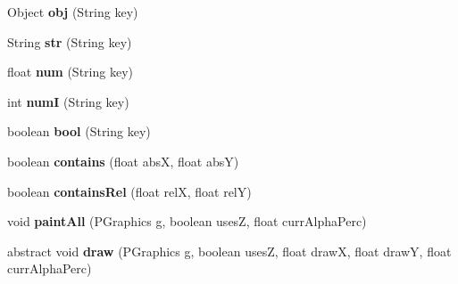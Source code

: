 \begin{DoxyCompactItemize}
\item 
\hypertarget{classhype_1_1drawable_1_1_h_drawable_ae9ef9be1550351bb13884016ccc755f1}{Object {\bfseries obj} (String key)}\label{classhype_1_1drawable_1_1_h_drawable_ae9ef9be1550351bb13884016ccc755f1}

\item 
\hypertarget{classhype_1_1drawable_1_1_h_drawable_a0d2393ad2936ee21fbb73fe8044f8c03}{String {\bfseries str} (String key)}\label{classhype_1_1drawable_1_1_h_drawable_a0d2393ad2936ee21fbb73fe8044f8c03}

\item 
\hypertarget{classhype_1_1drawable_1_1_h_drawable_aaafb5307820159466ebf60658c7a325d}{float {\bfseries num} (String key)}\label{classhype_1_1drawable_1_1_h_drawable_aaafb5307820159466ebf60658c7a325d}

\item 
\hypertarget{classhype_1_1drawable_1_1_h_drawable_a78a4cb7304e24e1706d9f23d0a387b43}{int {\bfseries num\-I} (String key)}\label{classhype_1_1drawable_1_1_h_drawable_a78a4cb7304e24e1706d9f23d0a387b43}

\item 
\hypertarget{classhype_1_1drawable_1_1_h_drawable_a138a8d2253dbfccb39889cb01b452f7c}{boolean {\bfseries bool} (String key)}\label{classhype_1_1drawable_1_1_h_drawable_a138a8d2253dbfccb39889cb01b452f7c}

\item 
\hypertarget{classhype_1_1drawable_1_1_h_drawable_a6662671b3f2c3f96cdd8883e0eb21fd6}{boolean {\bfseries contains} (float abs\-X, float abs\-Y)}\label{classhype_1_1drawable_1_1_h_drawable_a6662671b3f2c3f96cdd8883e0eb21fd6}

\item 
\hypertarget{classhype_1_1drawable_1_1_h_drawable_a40eaa02f8f52fc6891d77affe8b8f146}{boolean {\bfseries contains\-Rel} (float rel\-X, float rel\-Y)}\label{classhype_1_1drawable_1_1_h_drawable_a40eaa02f8f52fc6891d77affe8b8f146}

\item 
\hypertarget{classhype_1_1drawable_1_1_h_drawable_a54e5a75afb23f49b37ce769a11d10fb0}{void {\bfseries paint\-All} (P\-Graphics g, boolean uses\-Z, float curr\-Alpha\-Perc)}\label{classhype_1_1drawable_1_1_h_drawable_a54e5a75afb23f49b37ce769a11d10fb0}

\item 
\hypertarget{classhype_1_1drawable_1_1_h_drawable_a8e0af2cfaa89a93b3dab6b5f0ecdf964}{abstract void {\bfseries draw} (P\-Graphics g, boolean uses\-Z, float draw\-X, float draw\-Y, float curr\-Alpha\-Perc)}\label{classhype_1_1drawable_1_1_h_drawable_a8e0af2cfaa89a93b3dab6b5f0ecdf964}

\end{DoxyCompactItemize}
